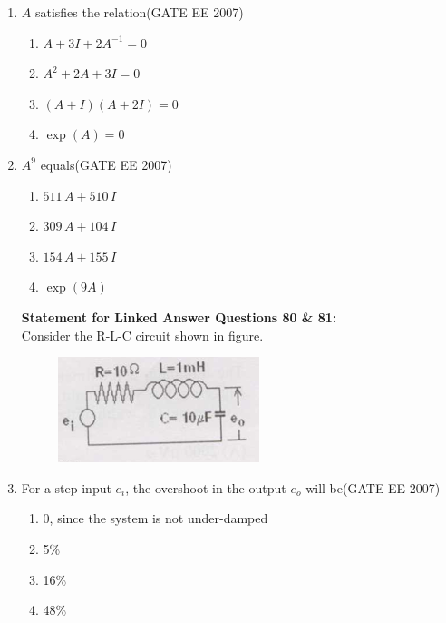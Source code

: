 \documentclass[a4paper,10pt]{exam}
\theoremstyle{remark}
\begin{document}
\begin{enumerate}
\item  $A$ satisfies the relation\hfill{(GATE EE 2007)}

\begin{multicols}{2}
\begin{enumerate}
    \item  $A + 3I + 2A^{-1} = 0$ 
 \item  $A^2 + 2A + 3I = 0$
 \item  $(A + I)(A + 2I) = 0$ 
 \item  $\exp(A) = 0$ 
\end{enumerate}
\end{multicols}

\item  $A^9$ equals\hfill{(GATE EE 2007)}

\begin{multicols}{2}
\begin{enumerate}
\item $511\, A + 510\, I$
\item $309\, A + 104\, I$
\item $154\, A + 155\, I$
\item $\exp(9A)$ 
\end{enumerate}
\end{multicols}

\noindent
\textbf{Statement for Linked Answer Questions 80 \& 81:}\\
Consider the R-L-C circuit shown in figure.
\begin{figure}[H]
    \centering
    \includegraphics[width=0.3\linewidth]{figs/Q 80,81.png}
\end{figure}
\item  For a step-input $e_i$, the overshoot in the output $e_o$ will be\hfill{(GATE EE 2007)}

\begin{multicols}{4}
\begin{enumerate}
    \item  0, since the system is not under-damped
  \item 5\% 
  \item  16\% 
  \item  48\% 
\end{enumerate}
\end{multicols}


\end{enumerate}
\end{document}
